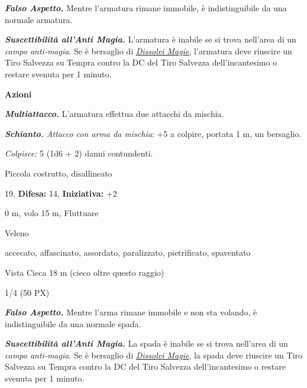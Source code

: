 \begin{multicols}{2}
{\emph{\textbf{Falso Aspetto.}} Mentre l'armatura rimane immobile, è indistinguibile da una normale armatura.

\emph{\textbf{Suscettibilità all'Anti Magia.}} L'armatura è inabile se si trova nell'area di un \emph{campo anti-magia}. Se è bersaglio di \emph{\hyperlink{Dissolvi Magie}{Dissolvi Magie}}, l'armatura deve riuscire un Tiro Salvezza su Tempra contro la DC del Tiro Salvezza dell'incantesimo o restare svenuta per 1 minuto.

\textbf{Azioni}

\emph{\textbf{Multiattacco.}} L'armatura effettua due attacchi da mischia.

\emph{\textbf{Schianto.} Attacco con arma da mischia}: +5 a colpire, portata 1 m, un bersaglio.

\emph{Colpisce:} 5 (1d6 + 2) danni contundenti.

\noindent
\begin{description}[noitemsep, topsep=0pt, parsep=0pt, partopsep=0pt, leftmargin=0cm, labelwidth=2.2cm]
	\item[\textbf{Taglia/Tipo:}] Piccola costrutto, disallineato
	\item[\textbf{Caratt.:}] 
	\item[\textbf{Punti Ferita:}] 19,  \textbf{Difesa:} 14,  \textbf{Iniziativa:} +2
	\item[\textbf{Movimento:}] 0 m, volo 15 m, Fluttuare
	\item[\textbf{Tiri Salvez.:}] 
	\item[\textbf{Imm. Danni:}] Veleno
	\item[\textbf{Immunità:}] accecato, affascinato, assordato, paralizzato, pietrificato, spaventato
	\item[\textbf{Sensi:}] Vista Cieca 18 m (cieco oltre questo raggio)
	\item[\textbf{Sfida:}] 1/4 (50 PX)\smallskip
\end{description}

\emph{\textbf{Falso Aspetto.}} Mentre l'arma rimane immobile e non sta volando, è indistinguibile da una normale spada.

\emph{\textbf{Suscettibilità all'Anti Magia.}} La spada è inabile se si trova nell'area di un \emph{campo anti-magia}. Se è bersaglio di \emph{\hyperlink{Dissolvi Magie}{Dissolvi Magie}}, la spada deve riuscire un Tiro Salvezza su Tempra contro la DC del Tiro Salvezza dell'incantesimo o restare svenuta per 1 minuto.

}
\end{multicols}
